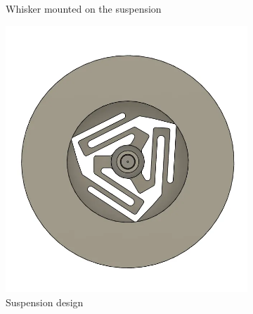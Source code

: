 \begin{figure}[ht]
\begin{subfigure}[b]{0.31\textwidth}
        \caption{Whisker mounted on the suspension} \label{fig:whisker}
    \end{subfigure}
    \hspace*{\fill}
    \begin{subfigure}[b]{0.31\textwidth}
        \centering
        \includegraphics[width=\linewidth]{figures/suspension}
        \caption{Suspension design} \label{fig:suspension}
    \end{subfigure}
    \hspace*{\fill}
    \begin{subfigure}[b]{0.31\textwidth}
        \centering

\end{subfigure}
\end{figure}
